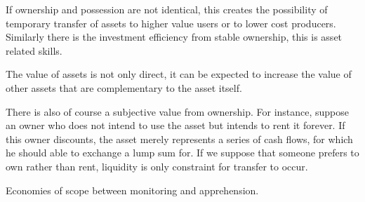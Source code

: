 \documentclass[12pt]{article}
\numberwithin{equation}{section}
\begin{document}
If ownership and possession are not identical, this creates the possibility of temporary transfer of assets to higher value users or to lower cost producers. Similarly there is the investment efficiency from stable ownership, this is asset related skills.

The value of assets is not only direct, it can be expected to increase the value of other assets that are complementary to the asset itself.  

There is also of course a subjective value from ownership. For instance, suppose an owner who does not intend to use the asset but intends to rent it forever. If this owner discounts, the asset merely represents a series of cash flows, for which he should able to exchange a lump sum for. If we suppose that someone prefers to own rather than rent, liquidity is only constraint for transfer to occur. 

Economies of scope between monitoring and apprehension. 


\end{document}
